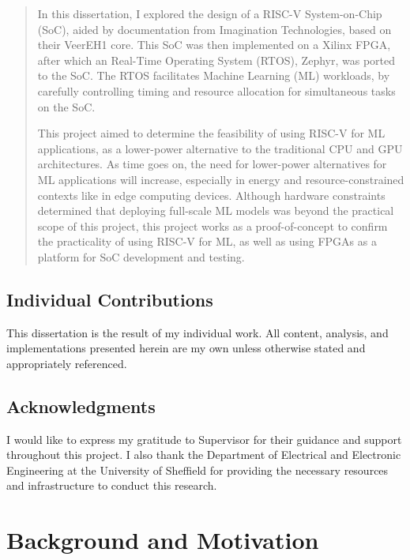 \documentclass[a4paper,12pt]{report}
\begin{document}
\begin{abstract}
\doublespacing
In this dissertation, I explored the design of a RISC-V System-on-Chip (SoC), aided by documentation from Imagination Technologies, based on their VeerEH1 core. This SoC was then implemented on a Xilinx FPGA, after which an Real-Time Operating System (RTOS), Zephyr, was ported to the SoC. The RTOS facilitates Machine Learning (ML) workloads, by carefully controlling timing and resource allocation for simultaneous tasks on the SoC.

This project aimed to determine the feasibility of using RISC-V for ML applications, as a lower-power alternative to the traditional CPU and GPU architectures. As time goes on, the need for lower-power alternatives for ML applications will increase, especially in energy and resource-constrained contexts like in edge computing devices. Although hardware constraints determined that deploying full-scale ML models was beyond the practical scope of this project, this project works as a proof-of-concept to confirm the practicality of using RISC-V for ML, as well as using FPGAs as a platform for SoC development and testing.

\end{abstract}


\section*{Individual Contributions}
This dissertation is the result of my individual work. All content, analysis, and implementations presented herein are my own unless otherwise stated and appropriately referenced.

\section*{Acknowledgments}
I would like to express my gratitude to Supervisor for their guidance and support throughout this project. I also thank the Department of Electrical and Electronic Engineering at the University of Sheffield for providing the necessary resources and infrastructure to conduct this research.

\tableofcontents
\clearpage

\listoffigures
\clearpage

\listoftables
\clearpage



\chapter{Background and Motivation}
\end{document}
